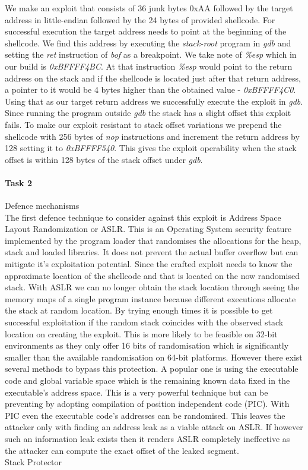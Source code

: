 \tab We make an exploit that consists of 36 junk bytes 0xAA followed by the target address in little-endian followed by the 24 bytes of provided shellcode. For successful execution the target address needs to point at the beginning of the shellcode. We find this address by executing the \emph{stack-root} program in \emph{gdb} and setting the \emph{ret} instruction of \emph{bof} as a breakpoint. We take note of \emph{\%esp} which in our build is \emph{0xBFFFF4BC}. At that instruction \emph{\%esp} would point to the return address on the stack and if the shellcode is located just after that return address, a pointer to it would be 4 bytes higher than the obtained value - \emph{0xBFFFF4C0}. Using that as our target return address we successfully execute the exploit in \emph{gdb}. Since running the program outside \emph{gdb} the stack has a slight offset this exploit fails. To make our exploit resistant to stack offset variations we prepend the shellcode with 256 bytes of \emph{nop} instructions and increment the return address by 128 setting it to \emph{0xBFFFF540}. This gives the exploit operability when the stack offset is within 128 bytes of the stack offset under \emph{gdb}. \\
\paragraph {Task 2} Defence mechanisms
\\
\tab The first defence technique to consider against this exploit is Address Space Layout Randomization or ASLR. This is an Operating System security feature implemented by the program loader that randomises the allocations for the heap, stack and loaded libraries. It does not prevent the actual buffer overflow but can mitigate it's exploitation potential. Since the crafted exploit needs to know the approximate location of the shellcode and that is located on the now randomised stack. With ASLR we can no longer obtain the stack location through seeing the memory maps of a single program instance because different executions allocate the stack at random location. By trying enough times it is possible to get successful exploitation if the random stack coincides with the observed stack location on creating the exploit. This is more likely to be feasible on 32-bit environments as they only offer 16 bits of randomisation which is significantly smaller than the available randomisation on 64-bit platforms. However there exist several methods to bypass this protection. A popular one is using the executable code and global variable space  which is the remaining known data fixed in the executable's address space. This is a very powerful technique but can be preventing by adopting compilation of position independent code (PIC). With PIC even the executable code's addresses can be randomised. This leaves the attacker only with finding an address leak as a viable attack on ASLR. If however such an information leak exists then it renders ASLR completely ineffective as the attacker can compute the exact offset of the leaked segment.\\
\tab Stack Protector \cite{Stackgua58} \\